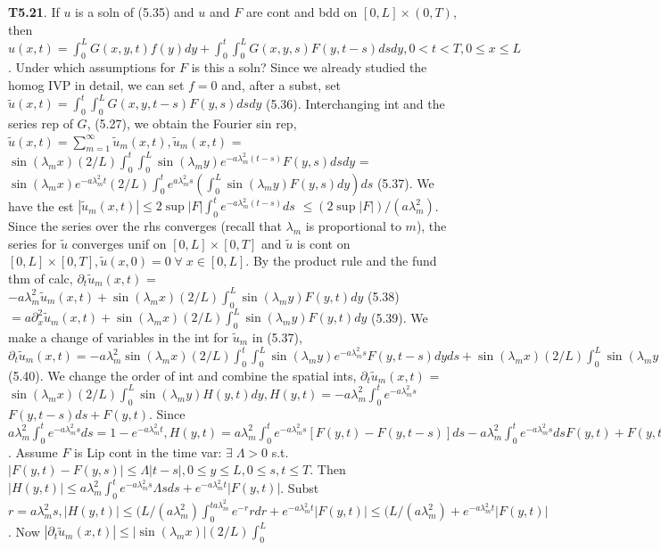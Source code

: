 {\bf T5.21}. If $u$ is a soln of (5.35) and $u$ and $F$ are cont and bdd on $[0,L] \times (0, T)$, then $u(x, t) = \int_0^L G(x,y,t)f(y)dy+\int_0^t \int_0^L G(x,y,s)F(y,t-s)dsdy, 0<t<T, 0\leq x \leq L$. Under which assumptions for $F$ is this a soln? Since we already studied the homog IVP in detail, we can set $f=0$ and, after a subst, set $\tilde{u}(x,t)=\int_0^t \int_0^L G(x,y,t-s)F(y,s)dsdy$ (5.36). Interchanging int and the series rep of $G$, (5.27), we obtain the Fourier sin rep, $\tilde{u}(x,t)=\sum_{m=1}^{\infty} \tilde{u}_m(x,t), \tilde{u}_m(x,t)$ = $\sin(\lambda_m x)(2/L)\int_0^t \int_0^L \sin(\lambda_m y)e^{-a \lambda_m^2(t-s)} F(y,s)dsdy$ = $\sin(\lambda_m x) e^{-a \lambda_m^2 t} (2/L)\int_0^t e^{a \lambda_m^2 s}(\int_0^L \sin(\lambda_m y) F(y,s)dy)ds$ (5.37).  
We have the est $|\tilde{u}_m(x,t)|\leq 2 \sup |F| \int_0^t e^{-a \lambda_m^2(t-s)}ds$
$\leq (2\sup|F|)/(a \lambda_m^2)$. Since the series over the rhs converges (recall that $\lambda_m$ is proportional to $m$), the series for $\tilde{u}$ converges unif on $[0,L] \times [0,T]$ and $\tilde{u}$ is cont on $[0,L] \times [0,T], \tilde{u}(x,0) = 0\; \forall \; x \in [0,L]$. By the product rule and the fund thm of calc, $\partial_t \tilde{u}_m(x,t)$ = $-a \lambda_m^2 \tilde{u}_m(x,t) + \sin(\lambda_m x) (2/L) \int_0^L \sin (\lambda_m y) F(y, t) dy$ (5.38)  $=a \partial_x^2 \tilde{u}_m(x,t) + \sin ( \lambda_m x) (2/L) \int_0^L \sin(\lambda_m y) F(y, t) dy$ (5.39). We make a change of variables in the int for $\tilde{u}_m$ in (5.37),  $\partial_t \tilde{u}_m(x,t) = -a \lambda_m^2  \sin(\lambda_m x) (2/L) \int_0^t \int_0^L \sin(\lambda_m y) e^{-a \lambda_m^2 s} F(y,t-s)dy ds +\sin(\lambda_m x) (2/L) \int_0^L \sin(\lambda_m y) F(y,t)dy$ (5.40). We change the order of int and combine the spatial ints, $\partial_t \tilde{u}_m(x,t)$ = $\sin(\lambda_m x) (2/L) \int_0^L \sin(\lambda_m y) H(y,t)dy, H(y,t) = -a \lambda_m^2  \int_0^t  e^{-a \lambda_m^2 s}$
$F(y,t-s)ds + F(y,t)$. Since $a \lambda_m^2  \int_0^t  e^{-a \lambda_m^2 s} ds = 1 - e^{-a \lambda_m^2 t}, H(y,t)=a \lambda_m^2  \int_0^t  e^{-a \lambda_m^2 s} [F(y,t) - F(y,t-s)]ds -a \lambda_m^2  \int_0^t  e^{-a \lambda_m^2 s} ds F(y,t)+ F(y,t) =a \lambda_m^2  \int_0^t  e^{-a \lambda_m^2 s} [F(y,t) - F(y,t-s)]ds + e^{-a \lambda_m^2 t} F(y,t)$.  Assume $F$ is Lip cont in the time var:  $\exists \; \Lambda >0$ s.t. $|F(y,t)- F(y,s)| \leq \Lambda|t-s|, 0 \leq y \leq L, 0\leq s,t \leq T$. Then $|H(y,t)| \leq a \lambda_m^2  \int_0^t  e^{-a \lambda_m^2 s} \Lambda s ds + e^{-a \lambda_m^2 t} |F(y,t)|$. Subst $r=a \lambda_m^2 s, |H(y,t)| \leq (L/(a \lambda_m^2) \int_0^{ta\lambda_m^2}e^{-r} r dr + e^{-a\lambda_m^2t} |F(y,t)| \leq  (L/(a \lambda_m^2) + e^{-a\lambda_m^2t} |F(y,t)|$. Now $|\partial_t \tilde{u}_m(x,t)| \leq | \sin(\lambda_m x)| (2/L) \int_0^L $
